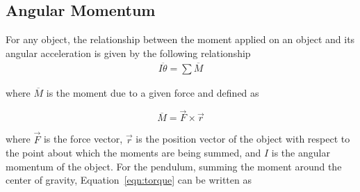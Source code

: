 \documentclass{notes}
\begin{document}

 
 

 \subsection{Angular Momentum}
 
 For any object, the relationship between the moment applied on an object and its angular acceleration is given by the following relationship
 \begin{align}
   I \ddot{\theta} = \sum \overline{M} \label{eqn:torque}
 \end{align}
 
 where $\overline{M}$ is the moment due to a given force and defined as 
 
 \[
 \overline{M} = \vec{F} \times \vec{r}
 \]
 
 where $\vec{F}$ is the force vector, $\vec{r}$ is the position vector of the object with respect to
 the point about which the moments are being summed, and $I$ is the angular momentum of the object.
 For the pendulum, summing the moment around the center of gravity, Equation~\ref{eqn:torque} can be
 written as
\end{document}
